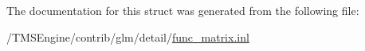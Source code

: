 The documentation for this struct was generated from the following file\+:\begin{DoxyCompactItemize}
\item 
/\+T\+M\+S\+Engine/contrib/glm/detail/\hyperlink{func__matrix_8inl}{func\+\_\+matrix.\+inl}\end{DoxyCompactItemize}
